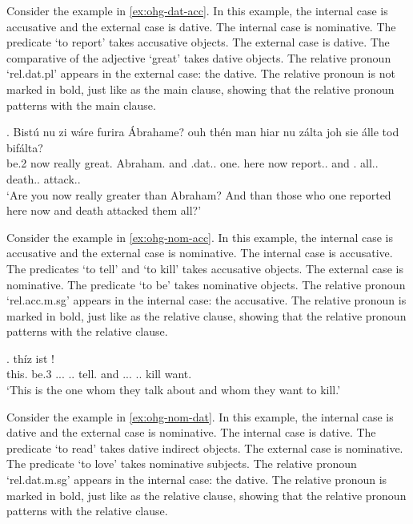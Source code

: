 Consider the example in \ref{ex:ohg-dat-acc}. In this example, the internal case is accusative and the external case is dative.
The internal case is nominative. The predicate  `to report' takes accusative objects.
The external case is dative. The comparative of the adjective  `great' takes dative objects.
The relative pronoun  `\ac{rel}.\ac{dat}.\ac{pl}' appears in the external case: the dative. The relative pronoun is not marked in bold, just like as the main clause, showing that the relative pronoun patterns with the main clause.

\exg. Bistú nu {zi wáre} furira Ábrahame? ouh thén man hiar nu zálta joh sie álle tod bifálta?\\
{be.2 } now really {great}.\scsub{[dat]} Abraham. and .\ac{dat}.. one. here now report..\scsub{[acc]}
and . all.. death.. attack..\\
`Are you now really greater than Abraham? And than those who one reported here now and death attacked them all?' \label{ex:ohg-dat-acc}

Consider the example in \ref{ex:ohg-nom-acc}. In this example, the internal case is accusative and the external case is nominative.
The internal case is accusative. The predicates  `to tell' and  `to kill' takes accusative objects.
The external case is nominative. The predicate  `to be' takes nominative objects.
The relative pronoun  `\ac{rel}.\ac{acc}.\ac{m}.\ac{sg}' appears in the internal case: the accusative. The relative pronoun is marked in bold, just like as the relative clause, showing that the relative pronoun patterns with the relative clause.

\exg. thíz ist        !\\
this. be.3\scsub{[nom]} ... .. tell.\scsub{[acc]}
and ... .. kill\scsub{[acc]} want.\\
`This is the one whom they talk about and whom they want to kill.' \label{ex:ohg-nom-acc}

Consider the example in \ref{ex:ohg-nom-dat}. In this example, the internal case is dative and the external case is nominative.
The internal case is dative. The predicate  `to read' takes dative indirect objects.
The external case is nominative. The predicate  `to love' takes nominative subjects.
The relative pronoun  `\ac{rel}.\ac{dat}.\ac{m}.\ac{sg}' appears in the internal case: the dative. The relative pronoun is marked in bold, just like as the relative clause, showing that the relative pronoun patterns with the relative clause.

